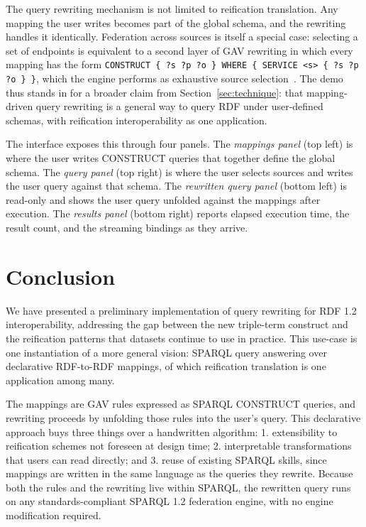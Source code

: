 \documentclass[
]{ceurart}
\begin{document}
The query rewriting mechanism is not limited to reification
translation. Any mapping the user writes becomes part of the global
schema, and the rewriting handles it identically. Federation across
sources is itself a special case: selecting a set of endpoints is
equivalent to a second layer of GAV rewriting in which every mapping
has the form
\texttt{CONSTRUCT \{ ?s ?p ?o \} WHERE \{ SERVICE <s> \{ ?s ?p ?o \} \}},
which the engine performs as exhaustive source
selection~\cite{heterogeneous_fedqpl}. The demo thus stands in for a
broader claim from Section~\ref{sec:technique}: that mapping-driven
query rewriting is a general way to query RDF under user-defined
schemas, with reification interoperability as one application.

The interface exposes this through four panels. The \emph{mappings
  panel} (top left) is where the user writes CONSTRUCT queries that
together define the global schema. The \emph{query panel} (top right)
is where the user selects sources and writes the user query against
that schema. The \emph{rewritten query panel} (bottom left) is
read-only and shows the user query unfolded against the mappings after
execution. The \emph{results panel} (bottom right) reports elapsed
execution time, the result count, and the streaming bindings as they
arrive.

\section{Conclusion}
\label{sec:conclusion}

We have presented a preliminary implementation of query rewriting for
RDF 1.2 interoperability, addressing the gap between the new
triple-term construct and the reification patterns that datasets
continue to use in practice. This use-case is one instantiation of a
more general vision: SPARQL query answering over declarative
RDF-to-RDF mappings, of which reification translation is one
application among many.

The mappings are GAV rules expressed as SPARQL CONSTRUCT queries, and
rewriting proceeds by unfolding those rules into the user's query.
This declarative approach buys three things over a handwritten
algorithm: 1. extensibility to reification schemes not foreseen at
design time; 2. interpretable transformations that users can read
directly; and 3. reuse of existing SPARQL skills, since mappings are
written in the same language as the queries they rewrite. Because both
the rules and the rewriting live within SPARQL, the rewritten query
runs on any standards-compliant SPARQL 1.2 federation engine, with no
engine modification required.
\end{document}
